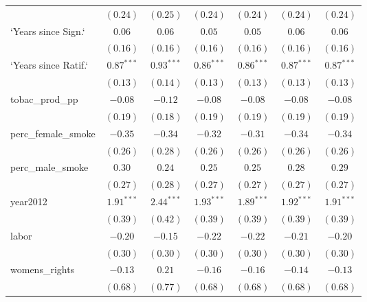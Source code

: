 \begin{table}[!h]
\begin{center}
\begin{tabular}{l c c c c c c }
                        & $(0.24)$     & $(0.25)$     & $(0.24)$     & $(0.24)$     & $(0.24)$     & $(0.24)$     \\
`Years since Sign.`     & $0.06$       & $0.06$       & $0.05$       & $0.05$       & $0.06$       & $0.06$       \\
                        & $(0.16)$     & $(0.16)$     & $(0.16)$     & $(0.16)$     & $(0.16)$     & $(0.16)$     \\
`Years since Ratif.`    & $0.87^{***}$ & $0.93^{***}$ & $0.86^{***}$ & $0.86^{***}$ & $0.87^{***}$ & $0.87^{***}$ \\
                        & $(0.13)$     & $(0.14)$     & $(0.13)$     & $(0.13)$     & $(0.13)$     & $(0.13)$     \\
tobac\_prod\_pp         & $-0.08$      & $-0.12$      & $-0.08$      & $-0.08$      & $-0.08$      & $-0.08$      \\
                        & $(0.19)$     & $(0.18)$     & $(0.19)$     & $(0.19)$     & $(0.19)$     & $(0.19)$     \\
perc\_female\_smoke     & $-0.35$      & $-0.34$      & $-0.32$      & $-0.31$      & $-0.34$      & $-0.34$      \\
                        & $(0.26)$     & $(0.28)$     & $(0.26)$     & $(0.26)$     & $(0.26)$     & $(0.26)$     \\
perc\_male\_smoke       & $0.30$       & $0.24$       & $0.25$       & $0.25$       & $0.28$       & $0.29$       \\
                        & $(0.27)$     & $(0.28)$     & $(0.27)$     & $(0.27)$     & $(0.27)$     & $(0.27)$     \\
year2012                & $1.91^{***}$ & $2.44^{***}$ & $1.93^{***}$ & $1.89^{***}$ & $1.92^{***}$ & $1.91^{***}$ \\
                        & $(0.39)$     & $(0.42)$     & $(0.39)$     & $(0.39)$     & $(0.39)$     & $(0.39)$     \\
labor                   & $-0.20$      & $-0.15$      & $-0.22$      & $-0.22$      & $-0.21$      & $-0.20$      \\
                        & $(0.30)$     & $(0.30)$     & $(0.30)$     & $(0.30)$     & $(0.30)$     & $(0.30)$     \\
womens\_rights          & $-0.13$      & $0.21$       & $-0.16$      & $-0.16$      & $-0.14$      & $-0.13$      \\
                        & $(0.68)$     & $(0.77)$     & $(0.68)$     & $(0.68)$     & $(0.68)$     & $(0.68)$     \\

\end{tabular}
\end{center}
\end{table}
